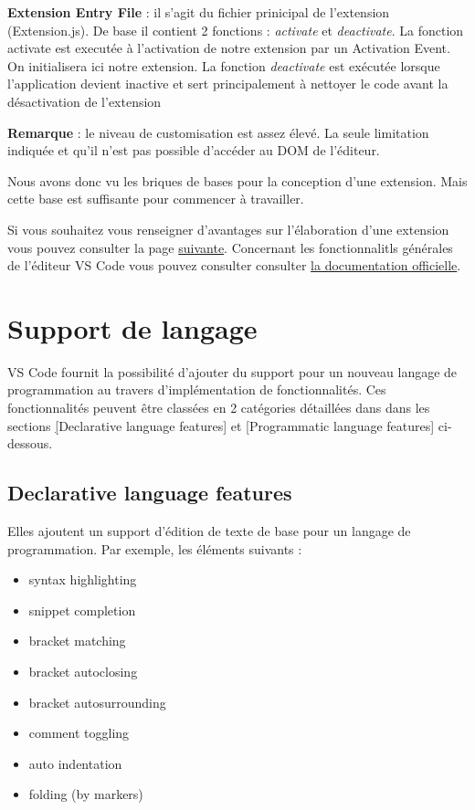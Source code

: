 \documentclass[
    iict, %
    il, %
]{heig-tb}
\begin{document}
\textbf{Extension Entry File} :
il s'agit du fichier prinicipal de l'extension (Extension.js).
De base il contient 2 fonctions : \emph{activate} et \emph{deactivate}.
La fonction activate est executée à l'activation de notre extension par un Activation Event. On initialisera ici notre extension.
La fonction \emph{deactivate} est exécutée lorsque l'application devient inactive et sert principalement à nettoyer le code avant la désactivation de l'extension

\textbf{Remarque} : le niveau de customisation est assez élevé. La seule limitation indiquée et qu'il n'est pas possible d'accéder au DOM de l'éditeur.

Nous avons donc vu les briques de bases pour la conception d'une extension. Mais cette base est suffisante pour commencer à travailler.

Si vous souhaitez vous renseigner d'avantages sur l'élaboration d'une extension vous pouvez consulter la page \href{https://code.visualstudio.com/api}{suivante}.
Concernant les fonctionnalitls générales de l'éditeur VS Code vous pouvez consulter consulter \href{https://code.visualstudio.com/docs}{la documentation officielle}.

\section{Support de langage}
VS Code fournit la possibilité d'ajouter du support pour un nouveau langage de programmation au travers d'implémentation de fonctionnalités. Ces fonctionnalités peuvent être classées en 2 catégories détaillées
dans dans les sections \hyperref[Declarative language features][Declarative language features] et \hyperref[Programmatic language features][Programmatic language features] ci-dessous.

\subsection{Declarative language features}\label{Declarative language features}
Elles ajoutent un support d'édition de texte de base pour un langage de programmation.
Par exemple, les éléments suivants :

\begin{itemize}
    \item syntax highlighting
    \item snippet completion
    \item bracket matching
    \item bracket autoclosing
    \item bracket autosurrounding
    \item comment toggling
    \item auto indentation
    \item folding (by markers)
\end{itemize}
\end{document}
